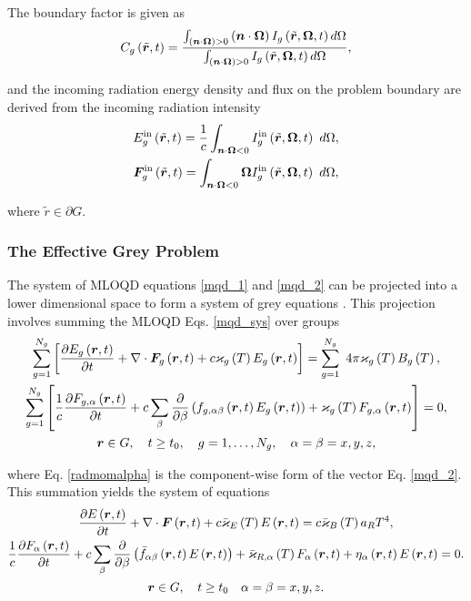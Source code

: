 	The boundary factor is given as
	\begin{equation}
	C_g\left(\tilde{\bm{r}},t\right) = \frac{ \int_{\left(\bm{n}\cdot\bm{\Omega}\right)>0} \left(\bm{n}\cdot\bm{\Omega}\right)I_{g}\left(\tilde{\bm{r}},\bm{\Omega},t\right) d\Omega }{ \int_{\left(\bm{n}\cdot\bm{\Omega}\right)>0} I_{g}\left(\tilde{\bm{r}},\bm{\Omega},t\right) d\Omega },
	\end{equation}
	
	and the incoming radiation energy density and flux on the problem boundary are derived from the incoming radiation intensity
	\begin{subequations}
		\begin{gather}
		E_g^{\text{in}}\left(\tilde{\bm{r}},t\right) = \frac{1}{c}\int_{\bm{n}\cdot\bm{\Omega}<0} I_{g}^{\text{in}}\left(\tilde{\bm{r}},\bm{\Omega},t\right) \ d\Omega, \\
		\bm{F}_g^{\text{in}}\left(\tilde{\bm{r}},t\right) = \int_{\bm{n}\cdot\bm{\Omega}<0} \bm{\Omega}I_{g}^{\text{in}}\left(\tilde{\bm{r}},\bm{\Omega},t\right) \ d\Omega,
		\end{gather}
	\end{subequations}	
	
	where $\tilde{r} \in\partial G$.
	
\subsubsection{The Effective Grey Problem} \label{eff_gr_prb}
	The system of MLOQD equations \eqref{mqd_1} and \eqref{mqd_2} can be projected into a lower dimensional space to form a system of grey equations \cite{Goldin-sbornik-82,PASE-1986,dya-aristova-vya-mm1996,aristova-vya-avk-m&c1999}. This projection involves summing the MLOQD Eqs. \eqref{mqd_sys} over groups
	\begin{gather}
		\sum_{g=1}^{N_g}\left[\frac{\partial E_g\left(\bm{r},t\right)}{\partial t} + \nabla\cdot\bm{F}_g\left(\bm{r},t\right) + c\varkappa_{g}\left( T\right)E_g\left(\bm{r},t\right)\right] = \sum_{g=1}^{N_g} \ 4\pi\varkappa_{g}\left( T\right)B_{g}\left( T\right), \\
		\sum_{g=1}^{N_g}\left[\frac{1}{c}\frac{\partial F_{g,\alpha}\left(\bm{r},t\right)}{\partial t} + c\sum_{\beta}\frac{\partial }{\partial \beta}\left( f_{g,\alpha\beta}\left(\bm{r},t\right)E_g\left(\bm{r},t\right)\right) + \varkappa_{g}\left( T\right) F_{g,\alpha}\left(\bm{r},t\right)\right] = 0, \label{radmomalpha}\\
		\bm{r} \in G, \quad t\geq t_0, \quad g=1,\dots,N_g, \quad \alpha=\beta=x,y,z, \nonumber
	\end{gather}
	
	where Eq. \eqref{radmomalpha} is the component-wise form of the vector Eq. \eqref{mqd_2}. This summation yields the system of equations
	\begin{subequations}
		\begin{gather}
			\frac{\partial E\left(\bm{r},t\right)}{\partial t} + \nabla\cdot\bm{F}\left(\bm{r},t\right) + c\bar{\varkappa}_{E}\left( T\right)E\left(\bm{r},t\right) = c\bar{\varkappa}_{B}\left( T\right)a_R T^4, \label{gqd_1.1} \\
			\frac{1}{c}\frac{\partial F_{\alpha}\left(\bm{r},t\right)}{\partial t} + c\sum_{\beta}\frac{\partial }{\partial \beta}\left(\bar{f}_{\alpha\beta}\left(\bm{r},t\right)E\left(\bm{r},t\right)\right) + \bar{\varkappa}_{R,\alpha}\left( T\right) F_{\alpha}\left(\bm{r},t\right) + \eta_{\alpha}\left(\bm{r},t\right)E\left(\bm{r},t\right)= 0. \label{gqd_1.2}\\
			\bm{r} \in G, \quad t\geq t_0 \quad \alpha=\beta=x,y,z. \nonumber
		\end{gather}
	\end{subequations}
	

